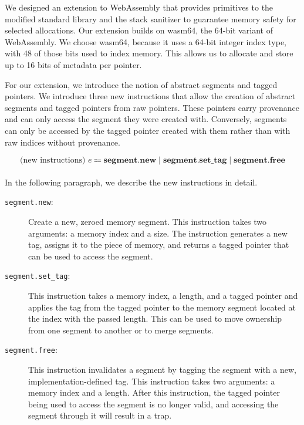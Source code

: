 We designed an extension to WebAssembly that provides primitives to the modified standard library and the stack sanitizer to guarantee memory safety for selected allocations.
Our extension builds on wasm64, the 64-bit variant of WebAssembly.
We choose wasm64, because it uses a 64-bit integer index type, with 48 of those bits used to index memory.
This allows us to allocate and store up to 16 bits of metadata per pointer.

For our extension, we introduce the notion of abstract segments and tagged pointers.
We introduce three new instructions that allow the creation of abstract segments and tagged pointers from raw pointers.
These pointers carry provenance and can only access the segment they were created with.
Conversely, segments can only be accessed by the tagged pointer created with them rather than with raw indices without provenance.

\begin{equation*}
    \text{(new instructions) } e \Coloneqq \textbf{segment.new} \mid \textbf{segment.set\_tag} \mid \textbf{segment.free}
\end{equation*}

\paragraph{}
In the following paragraph, we describe the new instructions in detail.

\begin{description}
    \item[\texttt{segment.new}:] Create a new, zeroed memory segment.
    This instruction takes two arguments: a memory index and a size.
    The instruction generates a new tag, assigns it to the piece of memory, and returns a tagged pointer that can be used to access the segment.
    \item[\texttt{segment.set\_tag}:] This instruction takes a memory index, a length, and a tagged pointer and applies the tag from the tagged pointer to the memory segment located at the index with the passed length.
    This can be used to move ownership from one segment to another or to merge segments.
    \item[\texttt{segment.free}:] This instruction invalidates a segment by tagging the segment with a new, implementation-defined tag.
    This instruction takes two arguments: a memory index and a length.
    After this instruction, the tagged pointer being used to access the segment is no longer valid, and accessing the segment through it will result in a trap.
\end{description}

